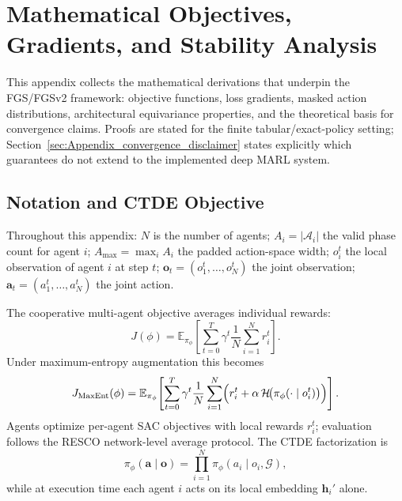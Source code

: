 \chapter{Mathematical Objectives, Gradients, and Stability Analysis}
\label{ch:Appendix_LossesObjectives}

This appendix collects the mathematical derivations that underpin the FGS/FGSv2 framework: objective functions, loss gradients, masked action distributions, architectural equivariance properties, and the theoretical basis for convergence claims. Proofs are stated for the finite tabular/exact-policy setting; Section~\ref{sec:Appendix_convergence_disclaimer} states explicitly which guarantees do not extend to the implemented deep MARL system.

\section{Notation and CTDE Objective}
\label{sec:Appendix_CTDE}

Throughout this appendix: $N$ is the number of agents; $A_i = |\mathcal{A}_i|$ the valid phase count for agent $i$; $A_{\max} = \max_i A_i$ the padded action-space width; $o_i^t$ the local observation of agent $i$ at step $t$; $\mathbf{o}_t = (o_1^t,\ldots,o_N^t)$ the joint observation; $\mathbf{a}_t = (a_1^t,\ldots,a_N^t)$ the joint action.

The cooperative multi-agent objective averages individual rewards:
\begin{equation}
  J(\phi) = \mathbb{E}_{\pi_\phi}\!\left[\sum_{t=0}^{T}\gamma^t \frac{1}{N}\sum_{i=1}^{N}r_i^t\right].
  \label{eq:marl_objective}
\end{equation}
Under maximum-entropy augmentation this becomes
\begin{equation}
  J_{\mathrm{MaxEnt}}(\phi) = \mathbb{E}_{\pi_\phi}\!\left[\sum_{t=0}^{T}\gamma^t \frac{1}{N}\sum_{i=1}^{N}\Bigl(r_i^t + \alpha\,\mathcal{H}\!\bigl(\pi_\phi(\cdot\mid o_i^t)\bigr)\Bigr)\right].
  \label{eq:marl_maxent}
\end{equation}
Agents optimize per-agent SAC objectives with local rewards $r_i^t$; evaluation follows the RESCO network-level average protocol. The CTDE factorization is
\begin{equation}
  \pi_\phi(\mathbf{a}\mid\mathbf{o}) = \prod_{i=1}^{N}\pi_\phi(a_i\mid o_i, \mathcal{G}),
\end{equation}
while at execution time each agent $i$ acts on its local embedding $\mathbf{h}_i'$ alone.

